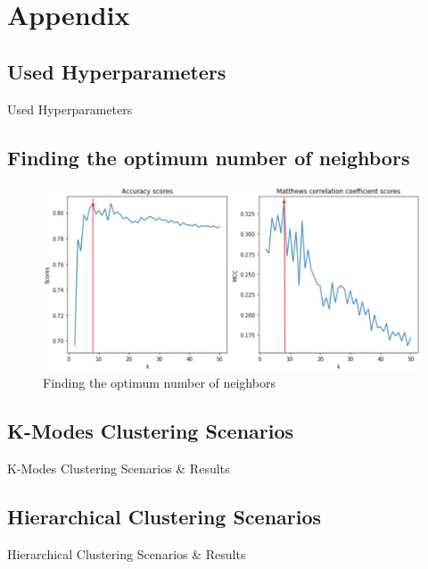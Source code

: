 \section{Appendix}

\subsection{Used Hyperparameters}
\label{ssec:ushp}
\begin{table}[h]
\begin{footnotesize}

\end{footnotesize}
\caption{\label{tab:Hyperparameters} Used Hyperparameters}
\end{table}

\subsection{Finding the optimum number of neighbors}
\label{ssec:fonn}
\begin{figure}[h]
    \centering
    \includegraphics[width=.7\linewidth]{ThesisTemplate/Images/KNN_n_neighbors.png}
    \caption{Finding the optimum number of neighbors}
\end{figure}

\subsection{K-Modes Clustering Scenarios}
\label{ssec:cluscen}
\begin{table}[H]
\begin{footnotesize}

\end{footnotesize}
\caption{\label{tab:clusc} K-Modes Clustering Scenarios \& Results}
\end{table}

\subsection{Hierarchical Clustering Scenarios}
\label{ssec:hieclu}
\begin{table}[H]
\begin{footnotesize}

\end{footnotesize}
\caption{\label{tab:hieclu} Hierarchical Clustering Scenarios \& Results}
\end{table}

